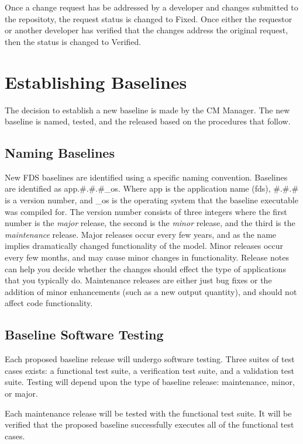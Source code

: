 \documentclass[11pt]{book}
\begin{document}
Once a change request has be addressed by a developer and changes submitted to the repositoty, the request status
is changed to {\ct Fixed}.  Once either the requestor or another developer has verified that the changes address 
the original request, then the status is changed to {\ct Verified}.  

\section{Establishing Baselines}

The decision to establish a new baseline is made by the CM Manager.  The new baseline is named, tested, and the
released based on the procedures that follow.

\subsection{Naming Baselines}

New FDS baselines are identified using a specific naming convention. Baselines are identified as app.\#.\#.\#\_os. 
Where app is the application name (fds), \#.\#.\# is a version number, and \_os is the operating system that the
baseline executable was compiled for.  The version number consists of three integers where the first number
is the {\em major} release, the second is the {\em minor} release, and the third is the {\em maintenance}
release.  Major releases occur every few years, and as the name implies dramatically changed functionality of the
model. Minor releases occur every few months, and may cause minor changes in functionality. 
Release notes can help you decide whether the changes should effect the type of applications that you typically do.
Maintenance releases are either just bug fixes or the addition of minor enhancements (such as a new output quantity),
and should not affect code functionality.

\subsection{Baseline Software Testing}

Each proposed baseline release will undergo software testing.  Three suites of test cases exists: a functional test suite,
a verification test suite, and a validation test suite.  Testing will depend upon the type of baseline release: 
maintenance, minor, or major.

Each maintenance release will be tested with the functional test suite.  It will be verified that the proposed baseline
successfully executes all of the functional test cases.  
\end{document}
